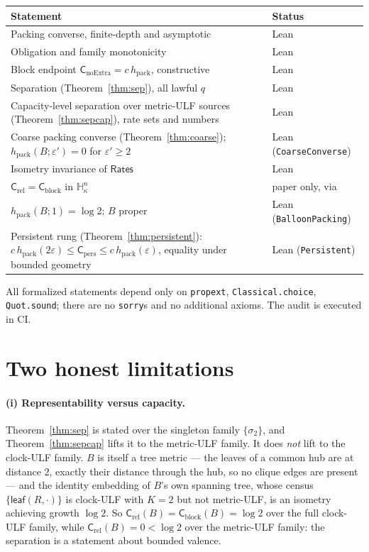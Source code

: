 \documentclass[11pt,a4paper]{article}
\theoremstyle{plain}
\theoremstyle{definition}
\theoremstyle{remark}
\newcommand{\Rates}{\mathsf{Rates}}
\newcommand{\Capy}{\mathsf{C}}
\newcommand{\hpack}{h_{\mathrm{pack}}}
\newcommand{\Hyp}{\mathbb{H}}
\begin{document}
\begin{center}
\begin{tabular}{@{}p{}p{}@{}}
\toprule
Statement & Status \\
\midrule
Packing converse, finite-depth and asymptotic & Lean \\
Obligation and family monotonicity & Lean \\
Block endpoint $\Capy_{\mathrm{noExtra}}=c\,\hpack$, constructive & Lean \\
Separation (Theorem~\ref{thm:sep}), all lawful $q$ & Lean \\
Capacity-level separation over metric-ULF sources (Theorem~\ref{thm:sepcap}), rate sets and numbers & Lean \\
Coarse packing converse (Theorem~\ref{thm:coarse}); $\hpack(B;\varepsilon')=0$ for $\varepsilon'\ge2$ & Lean (\texttt{CoarseConverse}) \\
Isometry invariance of $\Rates$ & Lean \\
$\Capy_{\mathrm{rel}}=\Capy_{\mathrm{block}}$ in $\Hyp^n_\kappa$ & paper only, via \cite{Skenderi} \\
$\hpack(B;1)=\log 2$; $B$ proper & Lean (\texttt{BalloonPacking}) \\
Persistent rung (Theorem~\ref{thm:persistent}): $c\,\hpack(2\varepsilon)\le\Capy_{\mathrm{pers}}\le c\,\hpack(\varepsilon)$, equality under bounded geometry & Lean (\texttt{Persistent}) \\
\bottomrule
\end{tabular}
\end{center}

All formalized statements depend only on \texttt{propext},
\texttt{Classical.choice}, \texttt{Quot.sound}; there are no \texttt{sorry}s and
no additional axioms. The audit is executed in CI.

\section{Two honest limitations}

\paragraph{(i) Representability versus capacity.}
Theorem~\ref{thm:sep} is stated over the singleton family $\{\sigma_2\}$, and
Theorem~\ref{thm:sepcap} lifts it to the metric-ULF family. It does \emph{not}
lift to the clock-ULF family. $B$ is itself a tree metric --- the leaves of a
common hub are at distance $2$, exactly their distance through the hub, so no
clique edges are present --- and the identity embedding of $B$'s own spanning
tree, whose census $\{\mathsf{leaf}(R,\cdot)\}$ is clock-ULF with $K=2$ but
not metric-ULF, is an isometry achieving growth $\log 2$. So
$\Capy_{\mathrm{rel}}(B)=\Capy_{\mathrm{block}}(B)=\log 2$ over the full
clock-ULF family, while $\Capy_{\mathrm{rel}}(B)=0<\log2$ over the metric-ULF
family: the separation is a statement about bounded valence.
\end{document}
